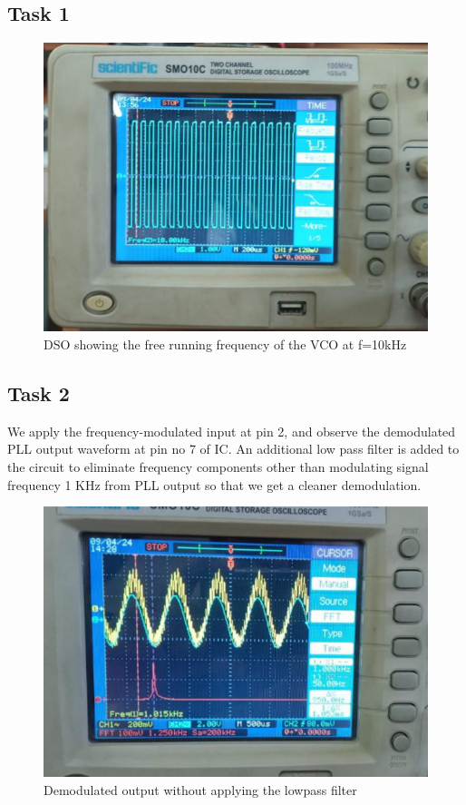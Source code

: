 \documentclass{article}
\begin{document}
\subsection{Task 1}
\begin{figure}[!ht]
\includegraphics[width=\textwidth]{FRF.png}
\caption{DSO showing the free running frequency of the VCO at f=10kHz}
\label{fig:FRF}
\end{figure}

\subsection{Task 2}
We apply the frequency-modulated input at pin 2, and observe the demodulated PLL output waveform at pin no 7 of IC. An additional low pass filter is added to the circuit to eliminate frequency components other than modulating signal frequency 1 KHz from PLL output so that we get a cleaner demodulation.

\begin{figure}[!ht]
\includegraphics[width=\textwidth]{Output.png}
\caption{Demodulated output without applying the lowpass filter}
\label{fig:no_LPF}
\end{figure}
\end{document}
